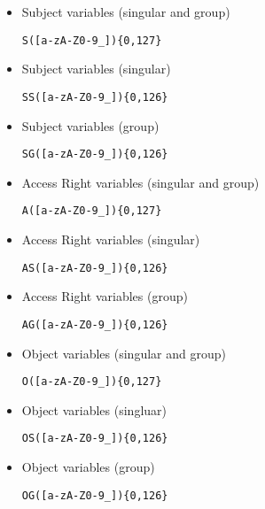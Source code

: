 \documentclass[10pt, twocolumn]{article}
\begin{document}
\begin{itemize}
              \begin{itemize}
                \item
                  Subject variables (singular and group)

                  \begin{verbatim}S([a-zA-Z0-9_]){0,127}\end{verbatim}
                \item
                  Subject variables (singular)

                  \begin{verbatim}SS([a-zA-Z0-9_]){0,126}\end{verbatim}
                \item
                  Subject variables (group)

                  \begin{verbatim}SG([a-zA-Z0-9_]){0,126}\end{verbatim}
                \item
                  Access Right variables (singular and group)

                  \begin{verbatim}A([a-zA-Z0-9_]){0,127}\end{verbatim}
                \item
                  Access Right variables (singular)

                  \begin{verbatim}AS([a-zA-Z0-9_]){0,126}\end{verbatim}
                \item
                  Access Right variables (group)

                  \begin{verbatim}AG([a-zA-Z0-9_]){0,126}\end{verbatim}
                \item
                  Object variables (singular and group)

                  \begin{verbatim}O([a-zA-Z0-9_]){0,127}\end{verbatim}
                \item
                  Object variables (singluar)

                  \begin{verbatim}OS([a-zA-Z0-9_]){0,126}\end{verbatim}
                \item
                  Object variables (group)

                  \begin{verbatim}OG([a-zA-Z0-9_]){0,126}\end{verbatim}
              \end{itemize}
          \end{itemize}
\end{document}
